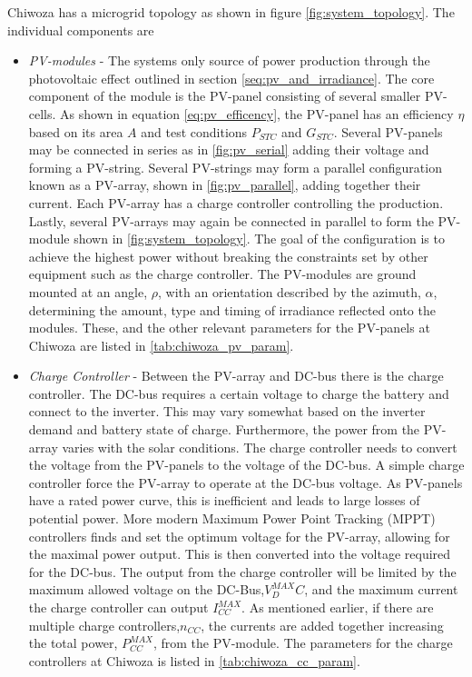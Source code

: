 Chiwoza has a microgrid topology as shown in figure \ref{fig:system_topology}. The individual components are 
\begin{itemize}
    \item \textit{PV-modules}   -   The systems only source of power production through the photovoltaic effect outlined in section \ref{seq:pv_and_irradiance}. The core component of the module is the PV-panel consisting of several smaller PV-cells. As shown in equation \ref{eq:pv_efficency}, the PV-panel has an efficiency $\eta$ based on its area $A$ and test conditions $P_{STC}$ and $G_{STC}$. Several PV-panels may be connected in series as in \ref{fig:pv_serial} adding their voltage and forming a PV-string. Several PV-strings may form a parallel configuration known as a PV-array, shown in \ref{fig:pv_parallel},  adding together their current. Each PV-array has a charge controller controlling the production. Lastly, several PV-arrays may again be connected in parallel to form the PV-module shown in \ref{fig:system_topology}. The goal of the configuration is to achieve the highest power without breaking the constraints set by other equipment such as the charge controller. The PV-modules are ground mounted at an angle, $\rho$, with an orientation described by the azimuth, $\alpha$, determining the amount, type and timing of irradiance reflected onto the modules. These, and the other relevant parameters for the PV-panels at Chiwoza are listed in \autoref{tab:chiwoza_pv_param}.
    
    \item \textit{Charge Controller}   -   Between the PV-array and DC-bus there is the charge controller. The DC-bus requires a certain voltage to charge the battery and connect to the inverter. This may vary somewhat based on the inverter demand and battery state of charge. Furthermore, the power from the PV-array varies with the solar conditions. The charge controller needs to convert the voltage from the PV-panels to the voltage of the DC-bus. A simple charge controller force the PV-array to operate at the DC-bus voltage. As PV-panels have a rated power curve, this is inefficient and leads to large losses of potential power. More modern Maximum Power Point Tracking (MPPT) controllers finds and set the optimum voltage for the PV-array, allowing for the maximal power output. This is then converted into the voltage required for the DC-bus.\cite{Svarc2022-oh} The output from the charge controller will be limited by the maximum allowed voltage on the DC-Bus,$V^{MAX}_DC$, and the maximum current the charge controller can output $I^{MAX}_{CC}$. As mentioned earlier, if there are multiple charge controllers,$n_{CC}$, the currents are added together increasing the total power, $P^{MAX}_{CC}$, from the PV-module. The parameters for the charge controllers  at Chiwoza is listed in \autoref{tab:chiwoza_cc_param}.
    

\end{itemize}
